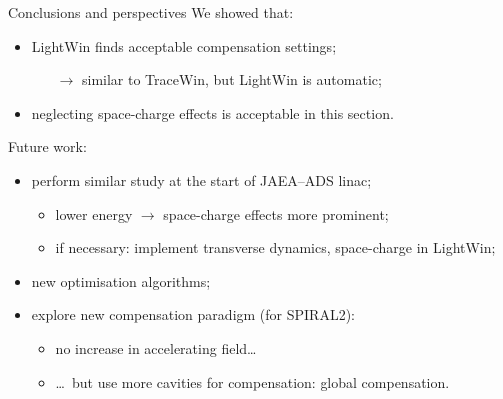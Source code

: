 \begin{frame}[t]
\begin{columns}[t]
\begin{column}{\colwidth}
            \begin{block}{Conclusions and perspectives}
               We showed that:
               \begin{itemize}
                  \item LightWin finds acceptable compensation settings;
                     \begin{itemize}
                        \item[\( \rightarrow \)] similar to TraceWin, but LightWin is automatic;
                     \end{itemize}
                  \item neglecting space-charge effects is acceptable in this section.
               \end{itemize}
               Future work:
               \begin{itemize}
                  \item perform similar study at the start of JAEA--ADS linac;
                     \begin{itemize}
                        \item lower energy \( \rightarrow \) space-charge effects more prominent;
                        \item if necessary: implement transverse dynamics, space-charge in LightWin;
                     \end{itemize}
                  \item new optimisation algorithms;
                  \item explore new compensation paradigm (\eg for SPIRAL2):
                     \begin{itemize}
                        \item no increase in accelerating field\ldots
                        \item \ldots~but use more cavities for compensation: \alert{global compensation}.
                     \end{itemize}
               \end{itemize}
            \end{block}

         \end{column}
         \separatorcolumn
      \end{columns}
\end{frame}


